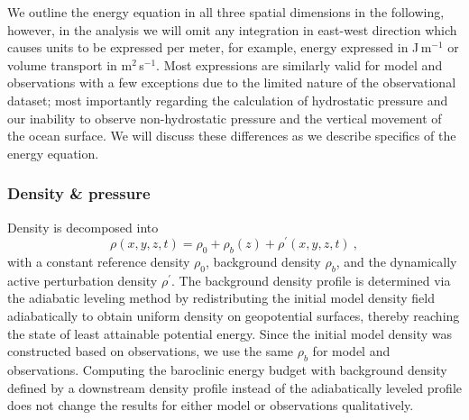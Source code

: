 \documentclass{ametsocV6.1}
\begin{document}
We outline the energy equation in all three spatial dimensions in the following, however, in the analysis we will omit any integration in east-west direction which causes units to be expressed per meter, for example, energy expressed in J\,m$^{-1}$ or volume transport in m$^2$\,s$^{-1}$.
Most expressions are similarly valid for model and observations with a few exceptions due to the limited nature of the observational dataset; most importantly regarding the calculation of hydrostatic pressure and our inability to observe non-hydrostatic pressure and the vertical movement of the ocean surface.
We will discuss these differences as we describe specifics of the energy equation.
\subsubsection{Density \& pressure}
Density is decomposed into
\begin{equation}
\rho(x,y,z,t) = \rho_0 + \rho_b(z)+ \rho^\prime(x,y,z,t)\ ,
\label{eq:DensityDecomposition}
\end{equation}
with a constant reference density $\rho_0$, background density $\rho_b$, and the dynamically active perturbation density $\rho^\prime$.
The background density profile is determined via the adiabatic leveling method \citep{brayfofonoff81, moumetal07} by redistributing the initial model density field adiabatically to obtain uniform density on geopotential surfaces, thereby reaching the state of least attainable potential energy.
Since the initial model density was constructed based on observations, we use the same $\rho_b$ for model and observations.
Computing the baroclinic energy budget with background density defined by a downstream density profile instead of the adiabatically leveled profile does not change the results for either model or observations qualitatively.
\end{document}
